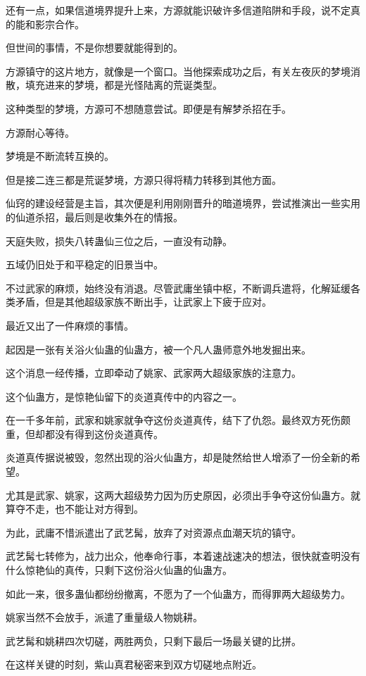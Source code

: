 \begin{this_body}
还有一点，如果信道境界提升上来，方源就能识破许多信道陷阱和手段，说不定真的能和影宗合作。

但世间的事情，不是你想要就能得到的。

方源镇守的这片地方，就像是一个窗口。当他探索成功之后，有关左夜灰的梦境消散，填充进来的梦境，都是光怪陆离的荒诞类型。

这种类型的梦境，方源可不想随意尝试。即便是有解梦杀招在手。

方源耐心等待。

梦境是不断流转互换的。

但是接二连三都是荒诞梦境，方源只得将精力转移到其他方面。

仙窍的建设经营是主旨，其次便是利用刚刚晋升的暗道境界，尝试推演出一些实用的仙道杀招，最后则是收集外在的情报。

天庭失败，损失八转蛊仙三位之后，一直没有动静。

五域仍旧处于和平稳定的旧景当中。

不过武家的麻烦，始终没有消退。尽管武庸坐镇中枢，不断调兵遣将，化解延缓各类矛盾，但是其他超级家族不断出手，让武家上下疲于应对。

最近又出了一件麻烦的事情。

起因是一张有关浴火仙蛊的仙蛊方，被一个凡人蛊师意外地发掘出来。

这个消息一经传播，立即牵动了姚家、武家两大超级家族的注意力。

这个仙蛊方，是惊艳仙留下的炎道真传中的内容之一。

在一千多年前，武家和姚家就争夺这份炎道真传，结下了仇怨。最终双方死伤颇重，但却都没有得到这份炎道真传。

炎道真传据说被毁，忽然出现的浴火仙蛊方，却是陡然给世人增添了一份全新的希望。

尤其是武家、姚家，这两大超级势力因为历史原因，必须出手争夺这份仙蛊方。就算夺不走，也不能让对方得到。

为此，武庸不惜派遣出了武艺髯，放弃了对资源点血潮天坑的镇守。

武艺髯七转修为，战力出众，他奉命行事，本着速战速决的想法，很快就查明没有什么惊艳仙的真传，只剩下这份浴火仙蛊的仙蛊方。

如此一来，很多蛊仙都纷纷撤离，不愿为了一个仙蛊方，而得罪两大超级势力。

姚家当然不会放手，派遣了重量级人物姚耕。

武艺髯和姚耕四次切磋，两胜两负，只剩下最后一场最关键的比拼。

在这样关键的时刻，紫山真君秘密来到双方切磋地点附近。


\end{this_body}

